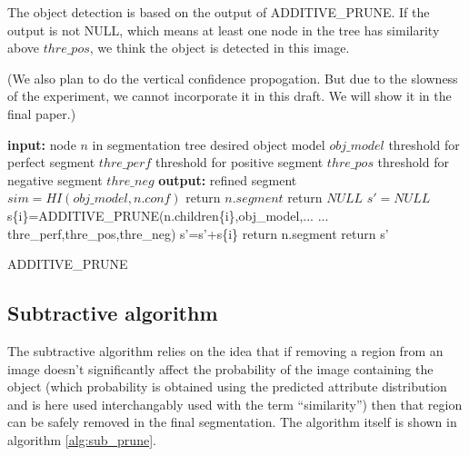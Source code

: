 \documentclass[10pt,twocolumn,letterpaper]{article}
\begin{document}
The object detection is based on the output of ADDITIVE\_PRUNE. If the output is not NULL, which means at least one node in the tree has similarity above $thre\_pos$, we think the object is detected in this image.

(We also plan to do the vertical confidence propogation. But due to the slowness of the experiment, we cannot incorporate it in this draft. We will show it in the final paper.)


\begin{algorithm}
\begin{algorithmic}
  \STATE \textbf{input:}
  \STATE \hspace{3 mm} node $n$ in segmentation tree
  \STATE \hspace{3 mm} desired object model $obj\_model$
  \STATE \hspace{3 mm} threshold for perfect segment $thre\_perf$
  \STATE \hspace{3 mm} threshold for positive segment $thre\_pos$
  \STATE \hspace{3 mm} threshold for negative segment $thre\_neg$
  \STATE \textbf{output:}
  \STATE \hspace{3 mm} refined segment
  \STATE
  \STATE $sim=HI(obj\_model,n.conf)$
    \STATE return $n.segment$
  \ENDIF
    \STATE return $NULL$
  \ENDIF
  \STATE $s'=NULL$
    \STATE s\{i\}=ADDITIVE\_PRUNE(n.children\{i\},obj\_model,...
    \STATE ... thre\_perf,thre\_pos,thre\_neg)
    \STATE s'=s'+s\{i\}
  \ENDFOR
    \STATE return n.segment
  \ELSE
    \STATE return s'
  \ENDIF
\end{algorithmic}
\caption{ADDITIVE\_PRUNE}
\label{alg:add_prune}
\end{algorithm}



\subsection{Subtractive algorithm}

The subtractive algorithm relies on the idea that if removing a region from
an image doesn't significantly affect the probability of the image containing
the object (which probability is obtained using the predicted attribute
distribution and is here used interchangably used with the term ``similarity'')
then that region can be safely removed in the final segmentation.
The algorithm itself is shown in algorithm \ref{alg:sub_prune}.
\end{document}

